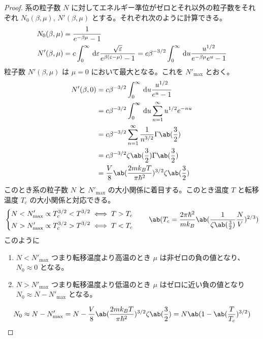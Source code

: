 \documentclass[a4paper,11pt]{jlreq}
\begin{document}
\begin{proof}
  系の粒子数 $N$ に対してエネルギー準位がゼロとそれ以外の粒子数をそれぞれ $N_0(\beta, \mu)$, $N'(\beta, \mu)$ とする。それぞれ次のように計算できる。
  \begin{align}
    N_0(\beta, \mu) & = \frac{1}{e^{-\beta\mu} - 1}                                                                                                                                                \\
    N'(\beta, \mu)  & = c\int_{0}^{\infty}\dl{\varepsilon}\frac{\sqrt{\varepsilon}}{e^{\beta(\varepsilon - \mu)} - 1} = c\beta^{-3/2}\int_{0}^{\infty}\dl{u}\frac{u^{1/2}}{e^{-\beta\mu}e^{u} - 1}
  \end{align}
  粒子数 $N'(\beta, \mu)$ は $\mu = 0$ において最大となる。これを $N'_{\max}$ とおく。
  \begin{align}
    N'(\beta, 0) & = c\beta^{-3/2}\int_{0}^{\infty}\dl{u}\frac{u^{1/2}}{e^{u} - 1}           \\
                 & = c\beta^{-3/2}\int_{0}^{\infty}\dl{u}\sum_{n=1}^{\infty}u^{1/2}e^{-nu}   \\
                 & = c\beta^{-3/2}\sum_{n=1}^{\infty}\frac{1}{n^{3/2}}\Gamma\ab(\frac{3}{2}) \\
                 & = c\beta^{-3/2}\zeta\ab(\frac{3}{2})\Gamma\ab(\frac{3}{2})                \\
                 & = \frac{V}{8}\ab(\frac{2mk_BT}{\pi\hbar^2})^{3/2}\zeta\ab(\frac{3}{2})
  \end{align}
  このとき系の粒子数 $N$ と $N'_{\max}$ の大小関係に着目する。このとき温度 $T$ と転移温度 $T_c$ の大小関係と対応できる。
  \begin{align}
    \begin{dcases}
      N   < N'_{\max} \propto T_c^{3/2} < T^{3/2} \iff T > T_c \\
      N   > N'_{\max} \propto T_c^{3/2} > T^{3/2} \iff T < T_c
    \end{dcases} \qquad
    \ab(T_c = \frac{2\pi\hbar^2}{mk_B}\ab(\frac{1}{\zeta\ab(\frac{3}{2})}\frac{N}{V})^{2/3})
  \end{align}
  このように
  \begin{enumerate}
    \item $N < N'_{\max}$ つまり転移温度より高温のとき $\mu$ は非ゼロの負の値となり、$N_0 \approx 0$ となる。
    \item $N > N'_{\max}$ つまり転移温度より低温のとき $\mu$ はゼロに近い負の値となり $N_0 \approx N - N'_{\max}$ となる。
  \end{enumerate}
  \begin{align}
    N_0 \approx N - N'_{\max} = N - \frac{V}{8}\ab(\frac{2mk_BT}{\pi\hbar^2})^{3/2}\zeta\ab(\frac{3}{2}) = N\ab(1 - \ab(\frac{T}{T_c})^{3/2})
  \end{align}


\end{proof}
\end{document}
